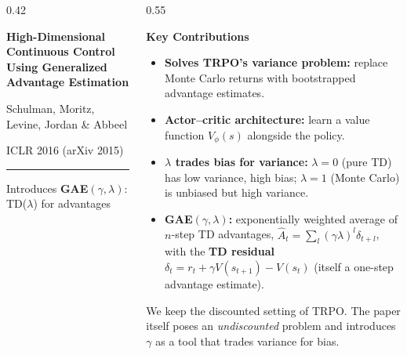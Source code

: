\documentclass[aspectratio=169]{beamer}
\newcommand{\paperpanel}[5][\Large]{%
  \begin{tcolorbox}[colback=AtlasCool, colframe=AtlasCool, arc=3pt, boxrule=0pt,
                    height=0.8\textheight, valign=center, left=12pt, right=12pt]
    \color{white}\raggedright
    {#1\bfseries #2\par}
    \vspace{12pt}
    {\normalsize #3\par}
    {\small #4\par}
    \vspace{14pt}
    {\color{white!80!AtlasCool}\rule{0.4\linewidth}{0.6pt}\par}
    \vspace{6pt}
    {\small #5\par}
  \end{tcolorbox}}
\begin{document}
\begin{frame}
  \begin{columns}[c]
    \begin{column}{0.42\textwidth}
      \paperpanel[\large]{High-Dimensional Continuous Control Using Generalized Advantage Estimation}
        {Schulman, Moritz, Levine, Jordan \& Abbeel}{ICLR 2016 (arXiv 2015)}
        {Introduces \textbf{GAE$(\gamma,\lambda)$}: TD($\lambda$) for advantages}
    \end{column}
    \begin{column}{0.55\textwidth}
      {\large\bfseries\color{AtlasAccent}Key Contributions\par}
      \vspace{6pt}
      \small
      \begin{itemize}
        \item \textbf{Solves TRPO's variance problem:} replace Monte Carlo returns with {\color{AtlasWarm}bootstrapped} advantage estimates.
        \item \textbf{Actor--critic architecture:} learn a value function $V_\phi(s)$ alongside the policy.
        \item \textbf{$\lambda$ trades bias for variance:} $\lambda=0$ (pure TD) has low variance, high bias; $\lambda=1$ (Monte Carlo) is unbiased but high variance.
        \item \textbf{GAE$(\gamma,\lambda)$:} exponentially weighted average of $n$-step TD advantages,
          $\hat A_t=\sum_l(\gamma\lambda)^l\delta_{t+l}$, with the \textbf{TD residual}
          {\color{AtlasWarm}$\delta_t = r_t+\gamma V(s_{t+1})-V(s_t)$} (itself a one-step advantage estimate).
      \end{itemize}
      \vspace{4pt}
      {\scriptsize\color{NoteGray} We keep the discounted setting of TRPO. The paper itself poses an \emph{undiscounted} problem and introduces $\gamma$ as a tool that trades variance for bias.\par}
    \end{column}
  \end{columns}
\end{frame}
\end{document}

